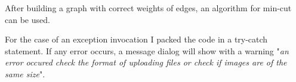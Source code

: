 \documentclass[12pt]{article}
\begin{document}
	
	
	After building a graph with correct weights of edges, an algorithm for min-cut can be used.
	
	For the case of an exception invocation I packed the code in a try-catch statement. If any error occurs, a message dialog will show with a warning "{\itshape an error occured check the format of uploading files or check if images are of the same size}".
	
\end{document}
